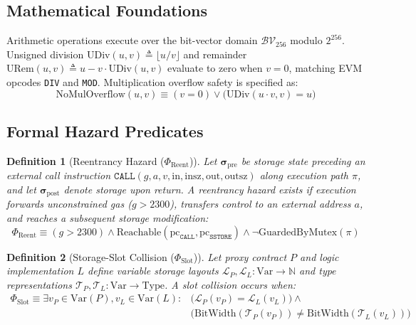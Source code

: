 \documentclass[pdflatex,sn-mathphys]{sn-jnl}
\theoremstyle{thmstyleone}
\newtheorem{definition}{Definition}
\theoremstyle{thmstyletwo}
\begin{document}
\subsection{Mathematical Foundations}\label{sec:math:state}

Arithmetic operations execute over the bit-vector domain $\mathcal{BV}_{256}$ modulo $2^{256}$. Unsigned division $\mathrm{UDiv}(u, v) \triangleq \lfloor u / v \rfloor$ and remainder $\mathrm{URem}(u, v) \triangleq u - v \cdot \mathrm{UDiv}(u, v)$ evaluate to zero when $v = 0$, matching EVM opcodes \texttt{DIV} and \texttt{MOD}. Multiplication overflow safety is specified as:
\begin{equation}
    \mathrm{NoMulOverflow}(u, v) \equiv (v = 0) \lor \big(\mathrm{UDiv}(u \cdot v, v) = u\big)
\end{equation}

\subsection{Formal Hazard Predicates}\label{sec:math:invariants}

\begin{definition}[Reentrancy Hazard ($\Phi_{\mathrm{Reent}}$)]\label{def:reent}
Let $\mathbf{\sigma}_{\mathrm{pre}}$ be storage state preceding an external call instruction $\mathtt{CALL}(g, a, v, \mathrm{in}, \mathrm{insz}, \mathrm{out}, \mathrm{outsz})$ along execution path $\pi$, and let $\mathbf{\sigma}_{\mathrm{post}}$ denote storage upon return. A reentrancy hazard exists if execution forwards unconstrained gas ($g > 2300$), transfers control to an external address $a$, and reaches a subsequent storage modification:
\begin{equation}
    \Phi_{\mathrm{Reent}} \equiv (g > 2300) \land \mathrm{Reachable}(\mathrm{pc}_{\mathtt{CALL}}, \mathrm{pc}_{\mathtt{SSTORE}}) \land \neg \mathrm{GuardedByMutex}(\pi)
\end{equation}
\end{definition}

\begin{definition}[Storage-Slot Collision ($\Phi_{\mathrm{Slot}}$)]\label{def:slot}
Let proxy contract $P$ and logic implementation $L$ define variable storage layouts $\mathcal{L}_P, \mathcal{L}_L: \mathrm{Var} \to \mathbb{N}$ and type representations $\mathcal{T}_P, \mathcal{T}_L: \mathrm{Var} \to \mathrm{Type}$. A slot collision occurs when:
\begin{equation}
\begin{aligned}
    \Phi_{\mathrm{Slot}} \equiv \exists v_P \in \mathrm{Var}(P), v_L \in \mathrm{Var}(L) : {} & \big( \mathcal{L}_P(v_P) = \mathcal{L}_L(v_L) \big) \land {} \\
    & \big( \mathrm{BitWidth}(\mathcal{T}_P(v_P)) \neq \mathrm{BitWidth}(\mathcal{T}_L(v_L)) \big)
\end{aligned}
\end{equation}
\end{definition}
\end{document}
